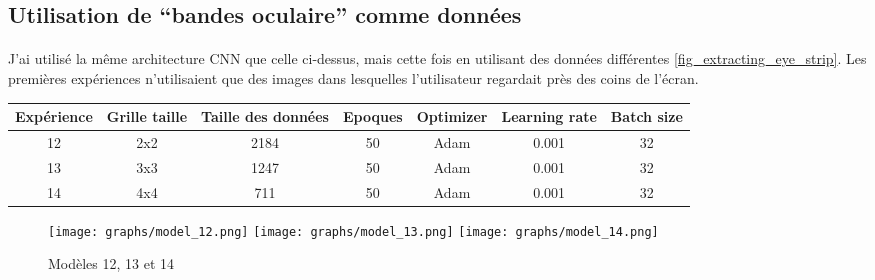 \subsection{Utilisation de ``bandes oculaire'' comme données}
\paragraph{}
J'ai utilisé la même architecture CNN que celle ci-dessus, mais cette fois en utilisant des données différentes \ref{fig_extracting_eye_strip}.
Les premières expériences n'utilisaient que des images dans lesquelles l'utilisateur regardait près des coins de l'écran.

\begin{center}
    \begin{tabular}{ c | c | c | c | c | c | c }
        \hline
        Expérience & Grille taille & Taille des données & Epoques & Optimizer & Learning rate & Batch size \\ 
        \hline
        12 & 2x2 & 2184 & 50 & Adam & 0.001 & 32 \\
        \hline
        13 & 3x3 & 1247 & 50 & Adam & 0.001 & 32 \\
        \hline
        14 & 4x4 & 711 & 50 & Adam & 0.001 & 32 \\
        \hline
    \end{tabular}
\end{center}

\begin{figure}[H]
    \centering
    \texttt{[image: graphs/model\_12.png]}
    \texttt{[image: graphs/model\_13.png]}
    \texttt{[image: graphs/model\_14.png]}
    \caption{Modèles 12, 13 et 14}
\end{figure}

